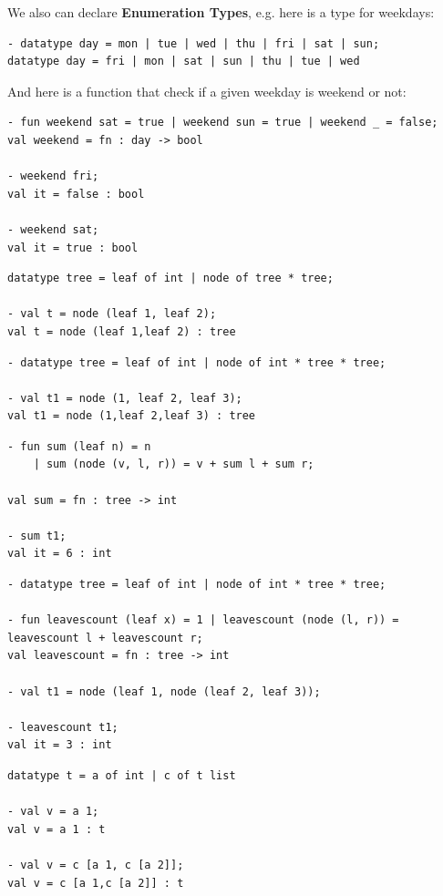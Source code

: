 We also can declare \textbf{Enumeration Types}, e.g. here is a type for weekdays:
\begin{verbatim}
- datatype day = mon | tue | wed | thu | fri | sat | sun;
datatype day = fri | mon | sat | sun | thu | tue | wed
\end{verbatim}
And here is a function that check if a given weekday is weekend or not:
\begin{verbatim}
- fun weekend sat = true | weekend sun = true | weekend _ = false;
val weekend = fn : day -> bool

- weekend fri;
val it = false : bool

- weekend sat;
val it = true : bool
\end{verbatim}

\begin{verbatim}
datatype tree = leaf of int | node of tree * tree;

- val t = node (leaf 1, leaf 2);
val t = node (leaf 1,leaf 2) : tree
\end{verbatim}

\begin{verbatim}
- datatype tree = leaf of int | node of int * tree * tree;

- val t1 = node (1, leaf 2, leaf 3);
val t1 = node (1,leaf 2,leaf 3) : tree
\end{verbatim}

\begin{verbatim}
- fun sum (leaf n) = n
    | sum (node (v, l, r)) = v + sum l + sum r;

val sum = fn : tree -> int

- sum t1;
val it = 6 : int
\end{verbatim}

\begin{verbatim}
- datatype tree = leaf of int | node of int * tree * tree;

- fun leavescount (leaf x) = 1 | leavescount (node (l, r)) = leavescount l + leavescount r;
val leavescount = fn : tree -> int

- val t1 = node (leaf 1, node (leaf 2, leaf 3));

- leavescount t1;
val it = 3 : int
\end{verbatim}

\begin{verbatim}
datatype t = a of int | c of t list

- val v = a 1;
val v = a 1 : t

- val v = c [a 1, c [a 2]];
val v = c [a 1,c [a 2]] : t
\end{verbatim}


